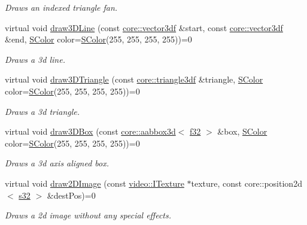 \begin{DoxyCompactItemize}
\begin{DoxyCompactList}\small\item\em Draws an indexed triangle fan. \end{DoxyCompactList}\item 
virtual void \hyperlink{classirr_1_1video_1_1IVideoDriver_a5e4e03dca1720f3d2019b73a4eebb5e6}{draw3\+D\+Line} (const \hyperlink{namespaceirr_1_1core_ae6e2b2a6c552833ebbd5b7463d03586b}{core\+::vector3df} \&start, const \hyperlink{namespaceirr_1_1core_ae6e2b2a6c552833ebbd5b7463d03586b}{core\+::vector3df} \&end, \hyperlink{classirr_1_1video_1_1SColor}{S\+Color} color=\hyperlink{classirr_1_1video_1_1SColor}{S\+Color}(255, 255, 255, 255))=0
\begin{DoxyCompactList}\small\item\em Draws a 3d line. \end{DoxyCompactList}\item 
virtual void \hyperlink{classirr_1_1video_1_1IVideoDriver_ac5eb03a333a43d17278dad31be19efca}{draw3\+D\+Triangle} (const \hyperlink{namespaceirr_1_1core_a8983bda2678a7a67d97bf3c7be6c31c7}{core\+::triangle3df} \&triangle, \hyperlink{classirr_1_1video_1_1SColor}{S\+Color} color=\hyperlink{classirr_1_1video_1_1SColor}{S\+Color}(255, 255, 255, 255))=0
\begin{DoxyCompactList}\small\item\em Draws a 3d triangle. \end{DoxyCompactList}\item 
virtual void \hyperlink{classirr_1_1video_1_1IVideoDriver_a7773fce9358ee81db5484b2d21015570}{draw3\+D\+Box} (const \hyperlink{classirr_1_1core_1_1aabbox3d}{core\+::aabbox3d}$<$ \hyperlink{namespaceirr_a0277be98d67dc26ff93b1a6a1d086b07}{f32} $>$ \&box, \hyperlink{classirr_1_1video_1_1SColor}{S\+Color} color=\hyperlink{classirr_1_1video_1_1SColor}{S\+Color}(255, 255, 255, 255))=0
\begin{DoxyCompactList}\small\item\em Draws a 3d axis aligned box. \end{DoxyCompactList}\item 
virtual void \hyperlink{classirr_1_1video_1_1IVideoDriver_ac1f12aefefb24414e03876bca942fb02}{draw2\+D\+Image} (const \hyperlink{classirr_1_1video_1_1ITexture}{video\+::\+I\+Texture} $\ast$texture, const core\+::position2d$<$ \hyperlink{namespaceirr_ac66849b7a6ed16e30ebede579f9b47c6}{s32} $>$ \&dest\+Pos)=0
\begin{DoxyCompactList}\small\item\em Draws a 2d image without any special effects. \end{DoxyCompactList}\item 

\end{DoxyCompactItemize}
